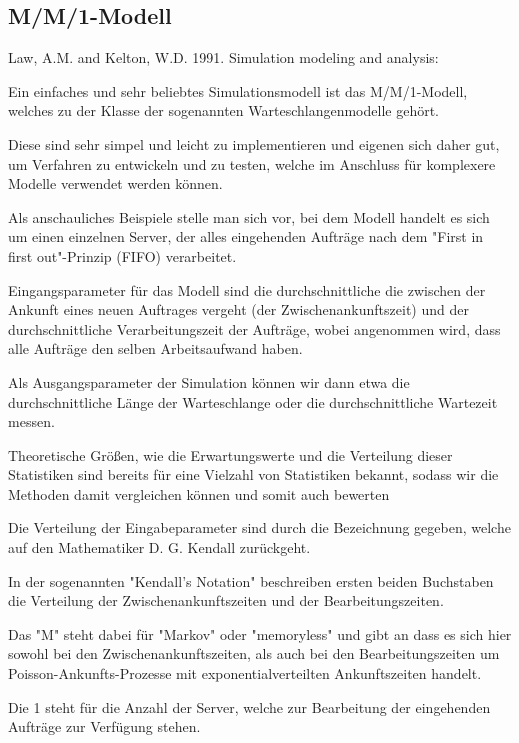 \subsection{M/M/1-Modell}


Law,  A.M.  and  Kelton,  W.D.  1991.  Simulation  modeling  and analysis:


Ein einfaches und sehr beliebtes Simulationsmodell ist das M/M/1-Modell, welches zu der Klasse der sogenannten Warteschlangenmodelle gehört. 

Diese sind sehr simpel und leicht zu implementieren und eigenen sich daher gut, um Verfahren zu entwickeln und zu testen, welche im Anschluss für komplexere Modelle verwendet werden können.

Als anschauliches Beispiele stelle man sich vor, bei dem Modell handelt es sich um einen einzelnen Server, der alles eingehenden Aufträge nach dem "First in first out"-Prinzip (FIFO) verarbeitet.

Eingangsparameter für das Modell sind die durchschnittliche die zwischen der Ankunft eines neuen Auftrages vergeht (der Zwischenankunftszeit) und der durchschnittliche Verarbeitungszeit der Aufträge, wobei angenommen wird, dass alle Aufträge den selben Arbeitsaufwand haben.

Als Ausgangsparameter der Simulation können wir dann etwa die durchschnittliche Länge der Warteschlange oder die durchschnittliche Wartezeit messen.

Theoretische Größen, wie die Erwartungswerte und die Verteilung dieser Statistiken sind bereits für eine Vielzahl von Statistiken bekannt, sodass wir die Methoden damit vergleichen können und somit auch bewerten

Die Verteilung der Eingabeparameter sind durch die Bezeichnung gegeben, welche
auf den Mathematiker D. G. Kendall zurückgeht.

In der sogenannten "Kendall's Notation" beschreiben ersten beiden Buchstaben die Verteilung der Zwischenankunftszeiten und der Bearbeitungszeiten.

Das "M" steht dabei für "Markov" oder "memoryless" und gibt an dass es sich hier sowohl bei den Zwischenankunftszeiten, als auch bei den Bearbeitungszeiten um Poisson-Ankunfts-Prozesse mit exponentialverteilten Ankunftszeiten handelt.

Die 1 steht für die Anzahl der Server, welche zur Bearbeitung der eingehenden Aufträge zur Verfügung stehen.

